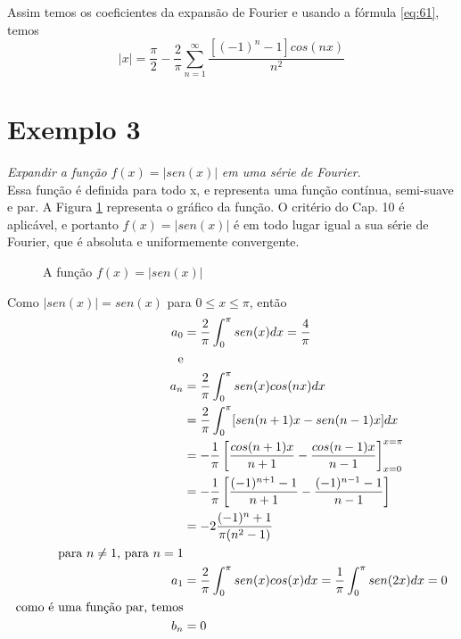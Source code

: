 Assim temos os coeficientes da expansão de Fourier e usando a fórmula \ref{eq:61}, temos
\begin{equation}
    |x| = \dfrac{\pi}{2} - \dfrac{2}{\pi}\sum\limits_{n=1}^{\infty} \dfrac{[(-1)^n - 1]cos(nx)}{n^2}
\end{equation}

\section*{Exemplo 3}
\textit{Expandir a função }$f(x) = |sen(x)|$\textit{ em uma série de Fourier.}\\

Essa função é definida para todo x, e representa uma função contínua, semi-suave e par. 
A Figura \ref{fig:exemplo3} representa o gráfico da função. O critério do Cap. 10 é 
aplicável, e portanto $f(x) = |sen(x)|$ é em todo lugar igual a sua série de Fourier,
que é absoluta e uniformemente convergente.

\begin{figure}[H]

    \caption{A função $f(x) = |sen(x)|$}
    \label{fig:exemplo3}
\end{figure}

Como $|sen(x)| = sen(x)$ para $0 \leq x \leq \pi$, então
\begin{equation}
    \notag
    \label{eq:exemplo3}
    \begin{split}
        a_0 &= \dfrac{2}{\pi} \int_{0}^{\pi}sen(x)dx = \dfrac{4}{\pi}\\
        \text{e}&\\
        a_n &= \dfrac{2}{\pi}\int_{0}^{\pi}sen(x)cos(nx)dx\\
        &= \dfrac{2}{\pi}\int_{0}^{\pi}[sen(n + 1)x - sen(n - 1)x]dx\\
        &= -\dfrac{1}{\pi}\left[\dfrac{cos(n+1)x}{n+1} - \dfrac{cos(n - 1)x}{n - 1}\right]_{x=0}^{x=\pi}\\
        &= -\dfrac{1}{\pi}\left[\dfrac{(-1)^{n+1}-1}{n+1} - \dfrac{(-1)^{n-1}-1}{n - 1}\right]\\
        &= -2\dfrac{(-1)^n + 1}{\pi(n^2 -1)}\\
        \text{para }n \neq 1\text{, para }n=1 &\\
        a_1 &= \dfrac{2}{\pi}\int_{0}^{\pi}sen(x)cos(x)dx =\dfrac{1}{\pi}\int_{0}^{\pi}sen(2x)dx = 0\\
        \text{como é uma função par, temos}&\\
        b_n &= 0
    \end{split} 
\end{equation}

